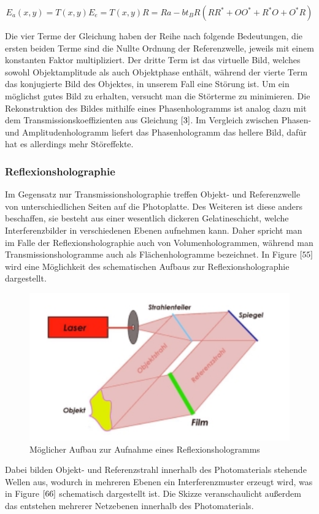 \documentclass[12pt,a4paper]{article}
\begin{document}
\begin{equation}
E_{a}(x,y) = T(x,y)E_{e} = T(x,y)R = Ra-bt_{B}R(RR^{*} + OO^{*} + R^{*}O + O^{*}R)
\label {1}
\end{equation}

Die vier Terme der Gleichung haben der Reihe nach folgende Bedeutungen, die ersten beiden Terme sind die Nullte Ordnung der Referenzwelle, jeweils mit einem konstanten Faktor multipliziert. Der dritte Term ist das virtuelle Bild, welches sowohl Objektamplitude als auch Objektphase enthält, während der vierte Term das konjugierte Bild des Objektes, in unserem Fall eine Störung ist. Um ein möglichst gutes Bild zu erhalten, versucht man die Störterme zu minimieren. Die Rekonstruktion des Bildes mithilfe eines Phasenhologramms ist analog dazu mit dem Transmissionskoeffizienten aus Gleichung $\ref{3}$. Im Vergleich zwischen Phasen- und Amplitudenhologramm liefert das Phasenhologramm das hellere Bild, dafür hat es allerdings mehr Störeffekte. 

\subsubsection{Reflexionsholographie}

Im Gegensatz nur Transmissionsholographie treffen Objekt- und Referenzwelle von unterschiedlichen Seiten auf die Photoplatte. Des Weiteren ist diese anders beschaffen, sie besteht aus einer wesentlich dickeren Gelatineschicht, welche Interferenzbilder in verschiedenen Ebenen aufnehmen kann. Daher spricht man im Falle der Reflexionsholographie auch von Volumenhologrammen, während man Transmissionshologramme auch als Flächenhologramme bezeichnet. In Figure $\ref{55}$ wird eine Möglichkeit des schematischen Aufbaus zur Reflexionsholographie dargestellt. 
\begin{figure}[h]
	\includegraphics[scale = 0.5]{Refl.png}
	\centering
	\caption{Möglicher Aufbau zur Aufnahme eines Reflexionshologramms}
	\label{55}
\end{figure}
Dabei bilden Objekt- und Referenzstrahl innerhalb des Photomaterials stehende Wellen aus, wodurch in mehreren Ebenen ein Interferenzmuster erzeugt wird, was in Figure $\ref{66}$ schematisch dargestellt ist. Die Skizze veranschaulicht außerdem das entstehen mehrerer Netzebenen innerhalb des Photomaterials. 
\end{document}
